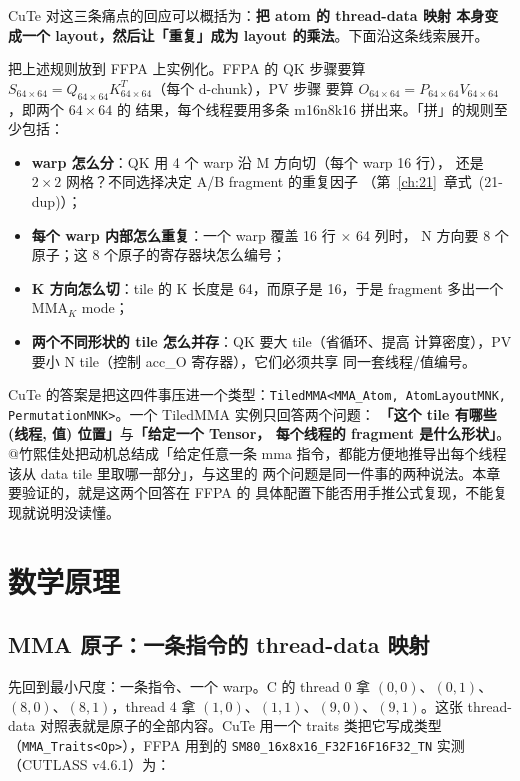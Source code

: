 CuTe 对这三条痛点的回应可以概括为：\textbf{把 atom 的 thread-data 映射
本身变成一个 layout，然后让「重复」成为 layout 的乘法}。下面沿这条线索展开。

把上述规则放到 FFPA 上实例化。FFPA 的 QK 步骤要算
$S_{64\times64} = Q_{64\times64} K^T_{64\times64}$（每个 d-chunk），PV 步骤
要算 $O_{64\times64} = P_{64\times64} V_{64\times64}$，即两个 $64\times64$ 的
结果，每个线程要用多条 m16n8k16 拼出来。「拼」的规则至少包括：

\begin{itemize}
  \item \textbf{warp 怎么分}：QK 用 4 个 warp 沿 M 方向切（每个 warp 16 行），
        还是 $2\times2$ 网格？不同选择决定 A/B fragment 的重复因子
        （第~\ref{ch:21}~章式~(21-dup)）；
  \item \textbf{每个 warp 内部怎么重复}：一个 warp 覆盖 16 行 $\times$ 64 列时，
        N 方向要 8 个原子；这 8 个原子的寄存器块怎么编号；
  \item \textbf{K 方向怎么切}：tile 的 K 长度是 64，而原子是 16，于是 fragment
        多出一个 $\mathrm{MMA}_K$ mode；
  \item \textbf{两个不同形状的 tile 怎么并存}：QK 要大 tile（省循环、提高
        计算密度），PV 要小 N tile（控制 acc\_O 寄存器），它们必须共享
        同一套线程/值编号。
\end{itemize}

CuTe 的答案是把这四件事压进一个类型：\texttt{Tiled\allowbreak{}MMA\allowbreak{}<MMA\_\allowbreak{}Atom,\allowbreak{}
Atom\allowbreak{}Layout\allowbreak{}MNK,\allowbreak{} Permutation\allowbreak{}MNK>}。一个 TiledMMA 实例只回答两个问题：
\textbf{「这个 tile 有哪些 (线程, 值) 位置」}与\textbf{「给定一个 Tensor，
每个线程的 fragment 是什么形状」}。@竹熙佳处把动机总结成「给定任意一条
mma 指令，都能方便地推导出每个线程该从 data tile 里取哪一部分」，与这里的
两个问题是同一件事的两种说法。本章要验证的，就是这两个回答在 FFPA 的
具体配置下能否用手推公式复现，不能复现就说明没读懂。

\section{数学原理}

\subsection{MMA 原子：一条指令的 thread-data 映射}

先回到最小尺度：一条指令、一个 warp。C 的 thread 0 拿 $(0,0)$、$(0,1)$、
$(8,0)$、$(8,1)$，thread 4 拿 $(1,0)$、$(1,1)$、$(9,0)$、$(9,1)$。这张
thread-data 对照表就是原子的全部内容。CuTe 用一个 traits 类把它写成类型
（\texttt{MMA\_\allowbreak{}Traits\allowbreak{}<Op>}），FFPA 用到的
\texttt{SM80\_\allowbreak{}16x8x16\_\allowbreak{}F32\allowbreak{}F16\allowbreak{}F16\allowbreak{}F32\_\allowbreak{}TN} 实测（CUTLASS v4.6.1）为：

